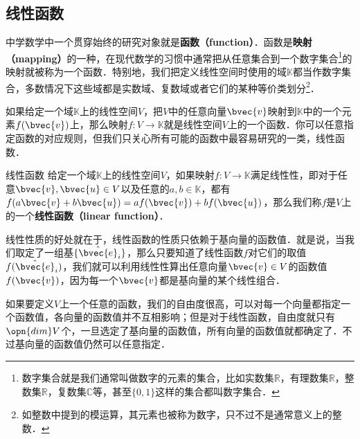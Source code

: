
\begin{issues}
\issueTODO
\end{issues}


\subsection{线性函数}

中学数学中一个贯穿始终的研究对象就是\textbf{函数（function）}．函数是\textbf{映射（mapping）}的一种，在现代数学的习惯中通常把从任意集合到一个数字集合\footnote{数字集合就是我们通常叫做数字的元素的集合，比如实数集$\mathbb{R}$，有理数集$\mathbb{R}$，整数集$\mathbb{R}$，复数集$\mathbb{C}$等，甚至$\{0, 1\}$这样的集合都叫数字集合．}的映射就被称为一个函数．特别地，我们把定义线性空间时使用的域$\mathbb{K}$都当作数字集合，多数情况下这些域都是实数域、复数域或者它们的某种等价类划分\footnote{如整数中提到的模运算，其元素也被称为数字，只不过不是通常意义上的整数．}．

如果给定一个域$\mathbb{K}$上的线性空间$V$，把$V$中的任意向量$\bvec{v}$映射到$\mathbb{K}$中的一个元素$f(\bvec{v})$上，那么映射$f:V\rightarrow\mathbb{K}$就是线性空间$V$上的一个函数．你可以任意指定函数的对应规则，但我们只关心所有可能的函数中最容易研究的一类，线性函数．

\begin{definition}{线性函数}
给定一个域$\mathbb{K}$上的线性空间$V$，如果映射$f:V\rightarrow\mathbb{K}$满足线性性，即对于任意$\bvec{v}, \bvec{u}\in V$以及任意的$a, b\in\mathbb{K}$，都有$f(a\bvec{v}+b\bvec{u})=af(\bvec{v})+bf(\bvec{u})$，那么我们称$f$是$V$上的一个\textbf{线性函数（linear function）}．
\end{definition}

线性性质的好处就在于，线性函数的性质只依赖于基向量的函数值．就是说，当我们取定了一组基$\{\hat{\bvec{e}}_i\}$，那么只要知道了线性函数$f$对它们的取值$f(\hat{\bvec{e}}_i)$，我们就可以利用线性性算出任意向量$\bvec{v}\in V$的函数值$f(\bvec{v})$，因为每一个$\bvec{v}$都是基向量的某个线性组合．

如果要定义$V$上一个任意的函数，我们的自由度很高，可以对每一个向量都指定一个函数值，各向量的函数值并不互相影响；但是对于线性函数，自由度就只有$\opn{dim} V$个，一旦选定了基向量的函数值，所有向量的函数值就都确定了．不过基向量的函数值仍然可以任意指定．
